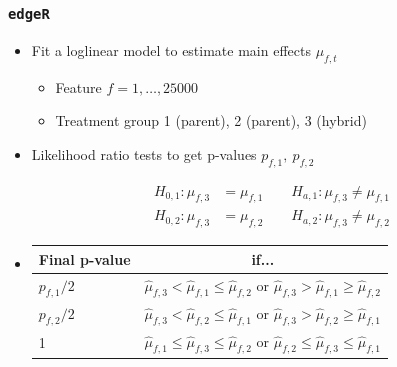 \documentclass[handout]{beamer}
\providecommand{\wh}[1]{\widehat{#1}}
\numberwithin{equation}{section}
\begin{document}
\begin{frame}
\frametitle{{\tt edgeR}}

\begin{itemize}
\item Fit a loglinear model to estimate main effects $\mu_{f, t}$
\begin{itemize}
\item Feature $f = 1, \ldots, 25000$
\item Treatment group 1 (parent), 2 (parent), 3 (hybrid)
\end{itemize}
\pause \item Likelihood ratio tests to get p-values $p_{f, 1}, \ p_{f, 2}$

\begin{align*}
H_{0, 1}: \mu_{f, 3} &= \mu_{f, 1} \qquad H_{a, 1}: \mu_{f, 3} \ne \mu_{f, 1} \\
H_{0, 2}: \mu_{f, 3} &= \mu_{f, 2} \qquad H_{a, 2}: \mu_{f, 3} \ne \mu_{f, 2}
\end{align*}


\pause \item 
\begin{center}
\begin{tabular}{l|c}
Final p-value & if... \\ \hline
$p_{f, 1}/2$ & $\wh{\mu}_{f, 3} < \wh{\mu}_{f, 1} \le \wh{\mu}_{f, 2}$ or $\wh{\mu}_{f, 3} > \wh{\mu}_{f, 1} \ge \wh{\mu}_{f, 2}$ \\
$p_{f, 2}/2$ & $\wh{\mu}_{f, 3} < \wh{\mu}_{f, 2} \le \wh{\mu}_{f, 1}$ or $\wh{\mu}_{f, 3} > \wh{\mu}_{f, 2} \ge \wh{\mu}_{f, 1}$ \\
1 & $\wh{\mu}_{f, 1} \le \wh{\mu}_{f, 3} \le \wh{\mu}_{f, 2}$ or $\wh{\mu}_{f, 2} \le \wh{\mu}_{f, 3} \le \wh{\mu}_{f, 1}$
\end{tabular}
\end{center}

\end{itemize}
\end{frame}
\end{document}
